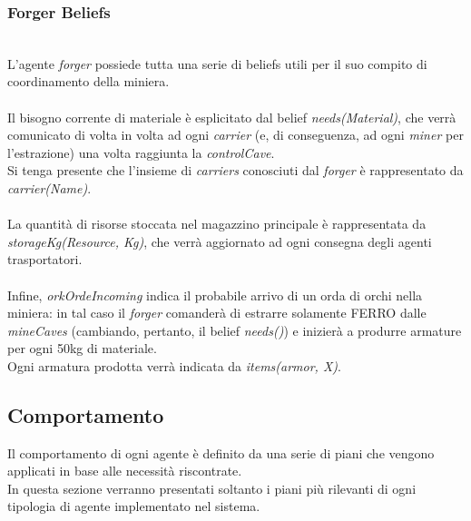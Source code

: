 \documentclass{llncs}
\begin{document}
\subsubsection{Forger Beliefs}~
\\
L'agente \textit{forger} possiede tutta una serie di beliefs utili per il suo compito di coordinamento della miniera.\\\\
Il bisogno corrente di materiale è esplicitato dal belief \textit{needs(Material)}, che verrà comunicato di volta in volta ad ogni \textit{carrier} (e, di conseguenza, ad ogni \textit{miner} per l'estrazione) una volta raggiunta la \textit{controlCave}.\\Si tenga presente che l'insieme di \textit{carriers} conosciuti dal \textit{forger} è rappresentato da \textit{carrier(Name)}.\\\\La quantità di risorse stoccata nel magazzino principale è rappresentata da \textit{storageKg(Resource, Kg)}, che verrà aggiornato ad ogni consegna degli agenti trasportatori.\\\\
Infine, \textit{orkOrdeIncoming} indica il probabile arrivo di un orda di orchi nella miniera: in tal caso il \textit{forger} comanderà di estrarre solamente FERRO dalle \textit{mineCaves} (cambiando, pertanto, il belief \textit{needs()}) e inizierà a produrre armature per ogni 50kg di materiale.\\
Ogni armatura prodotta verrà indicata da \textit{items(armor, X)}.
\newpage
\subsection{Comportamento}
Il comportamento di ogni agente è definito da una serie di piani che vengono applicati in base alle necessità riscontrate.\\
In questa sezione verranno presentati soltanto i piani più rilevanti di ogni tipologia di agente implementato nel sistema.
\end{document}
